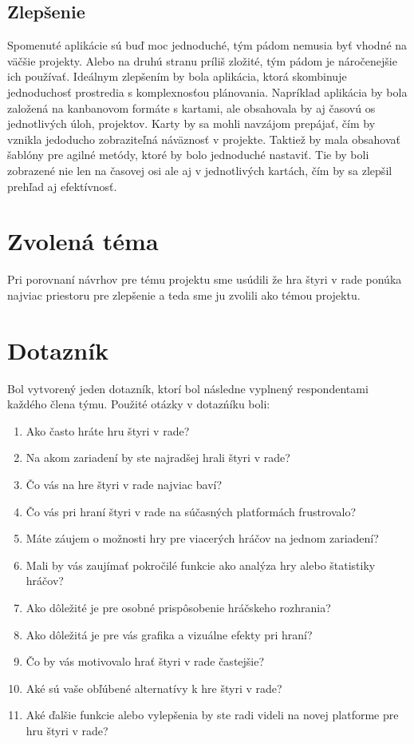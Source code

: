 \documentclass[a4paper, 11pt, onecolumn]{article}
\begin{document}
\subsection*{Zlepšenie}
Spomenuté aplikácie sú buď moc jednoduché, tým pádom nemusia byť vhodné na väčšie projekty. Alebo na druhú
stranu príliš zložité, tým pádom je náročenejšie ich používať. Ideálnym zlepšením by bola aplikácia,
ktorá skombinuje jednoduchosť prostredia s komplexnosťou plánovania. Napríklad aplikácia by bola
založená na kanbanovom formáte s kartami, ale obsahovala by aj časovú os jednotlivých úloh, projektov.
Karty by sa mohli navzájom prepájať, čím by vznikla jedoducho zobraziteľná náväznosť v projekte.
Taktiež by mala obsahovať šablóny pre agilné metódy, ktoré by bolo jednoduché nastaviť. Tie by boli zobrazené
nie len na časovej osi ale aj v jednotlivých kartách, čím by sa zlepšil prehľad aj efektívnosť.

\section{Zvolená téma}
Pri porovnaní návrhov pre tému projektu sme usúdili že hra štyri v rade
ponúka najviac priestoru pre zlepšenie a teda sme ju zvolili ako témou projektu.
\section{Dotazník}
Bol vytvorený jeden dotazník, ktorí bol následne vyplnený respondentami každého člena týmu.
Použité otázky v dotazńíku boli:
\begin{enumerate}
    \item Ako často hráte hru štyri v rade?
    \item Na akom zariadení by ste najradšej hrali štyri v rade?
    \item Čo vás na hre štyri v rade najviac baví?
    \item Čo vás pri hraní štyri v rade na súčasných platformách frustrovalo?
    \item Máte záujem o možnosti hry pre viacerých hráčov na jednom zariadení?
    \item Mali by vás zaujímať pokročilé funkcie ako analýza hry alebo štatistiky hráčov?
    \item Ako dôležité je pre osobné prispôsobenie hráčskeho rozhrania?
    \item Ako dôležitá je pre vás grafika a vizuálne efekty pri hraní?
    \item Čo by vás motivovalo hrať štyri v rade častejšie?
    \item Aké sú vaše obľúbené alternatívy k hre štyri v rade?
    \item Aké ďalšie funkcie alebo vylepšenia by ste radi videli na novej platforme pre hru štyri v rade?
\end{enumerate}
\end{document}
